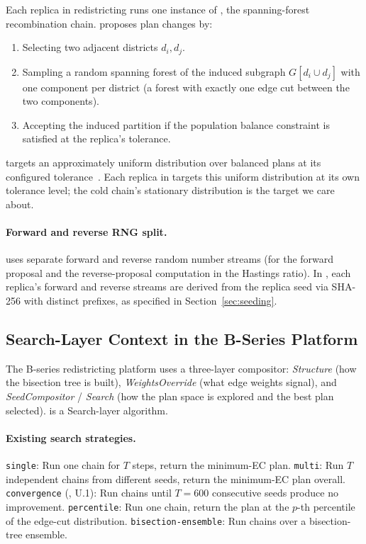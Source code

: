 Each replica in \pt{} redistricting runs one instance of \fr{}
\citep{dellaLibera2026forestRecom}, the spanning-forest recombination chain.
\fr{} proposes plan changes by:
\begin{enumerate}
\item Selecting two adjacent districts $d_i, d_j$.
\item Sampling a random spanning forest of the induced subgraph $G[d_i \cup d_j]$
  with one component per district (a forest with exactly one edge cut between
  the two components).
\item Accepting the induced partition if the population balance constraint is
  satisfied at the replica's tolerance.
\end{enumerate}
\fr{} targets an approximately uniform distribution over balanced plans at its
configured tolerance~\citep{dellaLibera2026forestRecom}.
Each replica in \pt{} targets this uniform distribution at its own tolerance
level; the cold chain's stationary distribution is the target we care about.

\paragraph{Forward and reverse RNG split.}
\fr{} uses separate forward and reverse random number streams (for the forward
proposal and the reverse-proposal computation in the Hastings ratio).
In \pt{}, each replica's forward and reverse streams are derived from the
replica seed via SHA-256 with distinct prefixes, as specified in
Section~\ref{sec:seeding}.

\subsection{Search-Layer Context in the B-Series Platform}

The B-series redistricting platform uses a three-layer compositor:
\emph{Structure} (how the bisection tree is built),
\emph{WeightsOverride} (what edge weights signal),
and \emph{SeedCompositor} / \emph{Search} (how the plan space is explored and
the best plan selected).
\pt{} is a Search-layer algorithm.

\paragraph{Existing search strategies.}
\texttt{single}: Run one \fr{} chain for $T$ steps, return the minimum-EC plan.
\texttt{multi}: Run $T$ independent chains from different seeds, return the
minimum-EC plan overall.
\texttt{convergence} (\cs{}, U.1): Run chains until $T=600$ consecutive seeds
produce no improvement.
\texttt{percentile}: Run one chain, return the plan at the $p$-th percentile
of the edge-cut distribution.
\texttt{bisection-ensemble}: Run chains over a bisection-tree ensemble.

